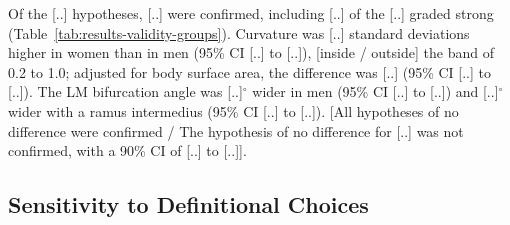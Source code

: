 Of the [..] hypotheses, [..] were confirmed, including [..] of the [..] graded strong (Table~\ref{tab:results-validity-groups}).
Curvature was [..] standard deviations higher in women than in men (95\% CI [..] to [..]), [inside / outside] the band of 0.2 to 1.0; adjusted for body surface area, the difference was [..] (95\% CI [..] to [..]).
The LM bifurcation angle was [..]$^{\circ}$ wider in men (95\% CI [..] to [..]) and [..]$^{\circ}$ wider with a ramus intermedius (95\% CI [..] to [..]).
[All hypotheses of no difference were confirmed / The hypothesis of no difference for [..] was not confirmed, with a 90\% CI of [..] to [..]].

\subsection{Sensitivity to Definitional Choices}
\label{sec:results-validity-sensitivity}

